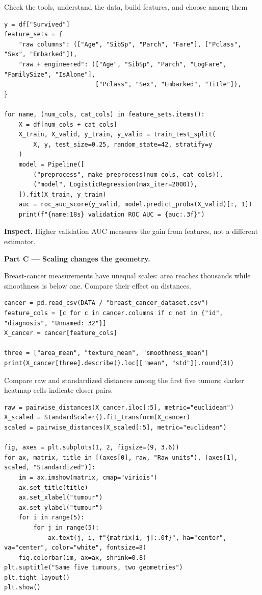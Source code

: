 \begin{labproject}{Check the tools, understand the data, build features, and choose among them}
\begin{lstlisting}[style=utppython]
y = df["Survived"]
feature_sets = {
    "raw columns": (["Age", "SibSp", "Parch", "Fare"], ["Pclass", "Sex", "Embarked"]),
    "raw + engineered": (["Age", "SibSp", "Parch", "LogFare", "FamilySize", "IsAlone"],
                         ["Pclass", "Sex", "Embarked", "Title"]),
}

for name, (num_cols, cat_cols) in feature_sets.items():
    X = df[num_cols + cat_cols]
    X_train, X_valid, y_train, y_valid = train_test_split(
        X, y, test_size=0.25, random_state=42, stratify=y
    )
    model = Pipeline([
        ("preprocess", make_preprocess(num_cols, cat_cols)),
        ("model", LogisticRegression(max_iter=2000)),
    ]).fit(X_train, y_train)
    auc = roc_auc_score(y_valid, model.predict_proba(X_valid)[:, 1])
    print(f"{name:18s} validation ROC AUC = {auc:.3f}")
\end{lstlisting}

\textbf{Inspect.} Higher validation AUC measures the gain from features, not a different estimator.

\medskip\noindent\textbf{Part C --- Scaling changes the geometry.}\par

Breast-cancer measurements have unequal scales: area reaches thousands while smoothness is below one. Compare their effect on distances.

\begin{lstlisting}[style=utppython]
cancer = pd.read_csv(DATA / "breast_cancer_dataset.csv")
feature_cols = [c for c in cancer.columns if c not in {"id", "diagnosis", "Unnamed: 32"}]
X_cancer = cancer[feature_cols]

three = ["area_mean", "texture_mean", "smoothness_mean"]
print(X_cancer[three].describe().loc[["mean", "std"]].round(3))
\end{lstlisting}

Compare raw and standardized distances among the first five tumors; darker heatmap cells indicate closer pairs.

\begin{lstlisting}[style=utppython]
raw = pairwise_distances(X_cancer.iloc[:5], metric="euclidean")
X_scaled = StandardScaler().fit_transform(X_cancer)
scaled = pairwise_distances(X_scaled[:5], metric="euclidean")

fig, axes = plt.subplots(1, 2, figsize=(9, 3.6))
for ax, matrix, title in [(axes[0], raw, "Raw units"), (axes[1], scaled, "Standardized")]:
    im = ax.imshow(matrix, cmap="viridis")
    ax.set_title(title)
    ax.set_xlabel("tumour")
    ax.set_ylabel("tumour")
    for i in range(5):
        for j in range(5):
            ax.text(j, i, f"{matrix[i, j]:.0f}", ha="center", va="center", color="white", fontsize=8)
    fig.colorbar(im, ax=ax, shrink=0.8)
plt.suptitle("Same five tumours, two geometries")
plt.tight_layout()
plt.show()
\end{lstlisting}


\end{labproject}
